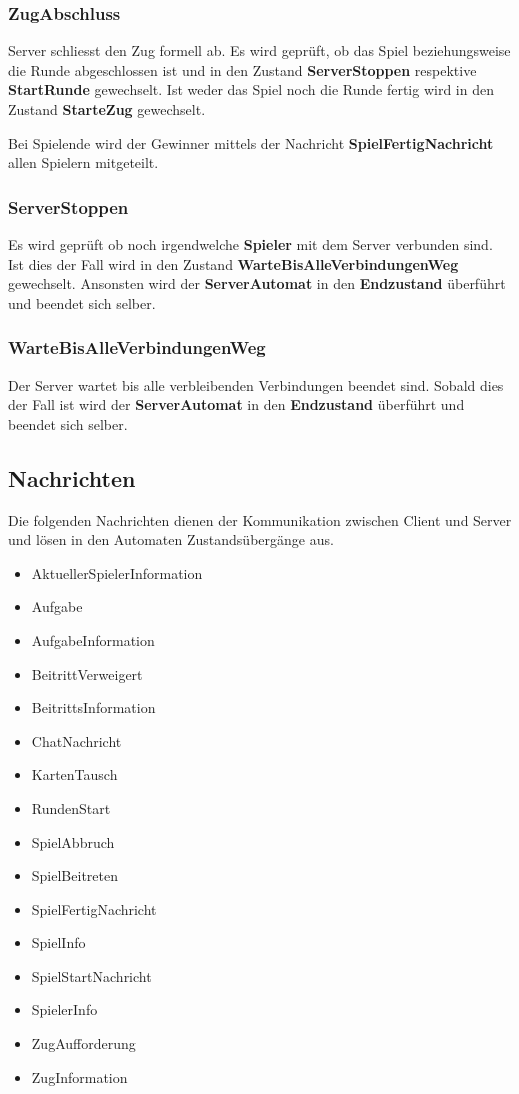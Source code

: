 \documentclass[12pt,halfparskip]{scrartcl}
\begin{document}
\subsubsection{ZugAbschluss}
\label{ssub:zugabschluss}
Server schliesst den Zug formell ab. Es wird geprüft, ob das Spiel beziehungsweise die Runde abgeschlossen ist und in den Zustand \textbf{ServerStoppen} respektive \textbf{StartRunde} gewechselt. Ist weder das Spiel noch die Runde fertig wird in den Zustand \textbf{StarteZug} gewechselt.

Bei Spielende wird der Gewinner mittels der Nachricht \textbf{SpielFertigNachricht} allen Spielern mitgeteilt.
	
\subsubsection{ServerStoppen}
Es wird geprüft ob noch irgendwelche \textbf{Spieler} mit dem Server verbunden sind. Ist dies der Fall wird in den Zustand \textbf{WarteBisAlleVerbindungenWeg} gewechselt. Ansonsten wird der \textbf{ServerAutomat} in den \textbf{Endzustand} überführt und beendet sich selber.

\subsubsection{WarteBisAlleVerbindungenWeg}

Der Server wartet bis alle verbleibenden Verbindungen beendet sind. Sobald dies der Fall ist wird der \textbf{ServerAutomat} in den \textbf{Endzustand} überführt und beendet sich selber.

\clearpage
\subsection{Nachrichten}

Die folgenden Nachrichten dienen der Kommunikation zwischen Client und Server und lösen in den Automaten Zustandsübergänge aus.

\begin{itemize}
	\item AktuellerSpielerInformation
	\item Aufgabe
	\item AufgabeInformation
	\item BeitrittVerweigert
	\item BeitrittsInformation
	\item ChatNachricht
	\item KartenTausch
	\item RundenStart
	\item SpielAbbruch
	\item SpielBeitreten
	\item SpielFertigNachricht
	\item SpielInfo
	\item SpielStartNachricht
	\item SpielerInfo
	\item ZugAufforderung
	\item ZugInformation
\end{itemize}
\end{document}
